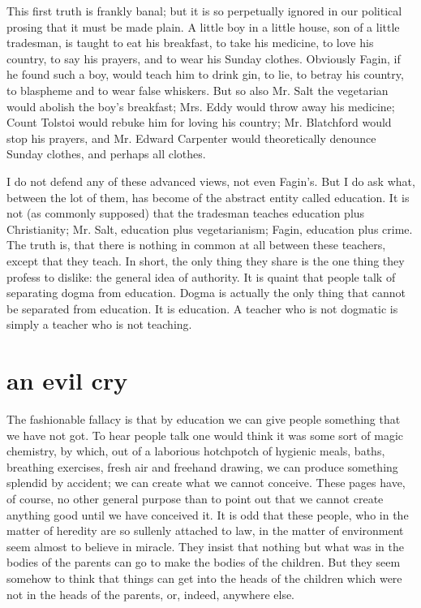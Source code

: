 \documentclass[final,10pt,letterpaper,twocolumn,openany]{book}
\begin{document}
This first truth is frankly banal; but it is so perpetually ignored in our
political prosing that it must be made plain. A little boy in a little house,
son of a little tradesman, is taught to eat his breakfast, to take his medicine,
to love his country, to say his prayers, and to wear his Sunday clothes.
Obviously Fagin, if he found such a boy, would teach him to drink gin, to
lie, to betray his country, to blaspheme and to wear false whiskers. But so
also Mr. Salt the vegetarian would abolish the boy's breakfast; Mrs. Eddy
would throw away his medicine; Count Tolstoi would rebuke him for
loving his country; Mr. Blatchford would stop his prayers, and Mr. Edward
Carpenter would theoretically denounce Sunday clothes, and perhaps all
clothes. 

I do not defend any of these advanced views, not even Fagin's.
But I do ask what, between the lot of them, has become of the abstract
entity called education. It is not (as commonly supposed) that the
tradesman teaches education plus Christianity; Mr. Salt, education plus
vegetarianism; Fagin, education plus crime. The truth is, that there is
nothing in common at all between these teachers, except that they teach. In
short, the only thing they share is the one thing they profess to dislike: the
general idea of authority. It is quaint that people talk of separating dogma
from education. Dogma is actually the only thing that cannot be separated
from education. It is education. A teacher who is not dogmatic is simply a
teacher who is not teaching.

\section{an evil cry}

    The fashionable fallacy is that by education we can give people
something that we have not got. To hear people talk one would think it
was some sort of magic chemistry, by which, out of a laborious hotchpotch
of hygienic meals, baths, breathing exercises, fresh air and freehand
drawing, we can produce something splendid by accident; we can create
what we cannot conceive. These pages have, of course, no other general
purpose than to point out that we cannot create anything good until we
have conceived it. It is odd that these people, who in the matter of heredity
are so sullenly attached to law, in the matter of environment seem almost
to believe in miracle. They insist that nothing but what was in the bodies
of the parents can go to make the bodies of the children. But they seem
somehow to think that things can get into the heads of the children which
were not in the heads of the parents, or, indeed, anywhere else.
\end{document}

